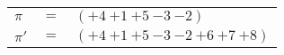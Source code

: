 \begin{example}\label{example:AWNIOTEZ}
  \hfill \break
  \begin{tabular}{lll}
    $\pi$  & $=$ & $({+4}~{+1}~{+5}~{-3}~{-2})$ \\
    $\pi'$ & $=$ & $({+4}~{+1}~{+5}~{-3}~{-2}~{+6}~{+7}~{+8})$ \\
  \end{tabular}
\end{example}